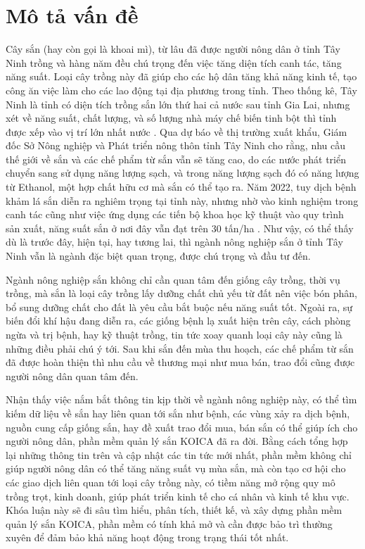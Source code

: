 \documentclass[./../main.tex]{subfiles}
\begin{document}
\section{Mô tả vấn đề}

Cây sắn (hay còn gọi là khoai mì), từ lâu đã được người nông dân ở tỉnh Tây Ninh trồng và hàng năm đều chú trọng đến việc tăng diện tích canh tác, tăng năng suất. Loại cây trồng này đã giúp cho các hộ dân tăng khả năng kinh tế, tạo công ăn việc làm cho các lao động tại địa phương trong tỉnh. Theo thống kê, Tây Ninh là tỉnh có diện tích trồng sắn lớn thứ hai cả nước sau tỉnh Gia Lai, nhưng xét về năng suất, chất lượng, và số lượng nhà máy chế biến tinh bột thì tỉnh được xếp vào vị trí lớn nhất nước \cite{tayninh1}. Qua dự báo về thị trường xuất khẩu, Giám đốc Sở Nông nghiệp và Phát triển nông thôn tỉnh Tây Ninh cho rằng, nhu cầu thế giới về sắn và các chế phẩm từ sắn vẫn sẽ tăng cao, do các nước phát triển chuyển sang sử dụng năng lượng sạch, và trong năng lượng sạch đó có năng lượng từ Ethanol, một hợp chất hữu cơ mà sắn có thể tạo ra. Năm 2022, tuy dịch bệnh khảm lá sắn diễn ra nghiêm trọng tại tỉnh này, nhưng nhờ vào kinh nghiệm trong canh tác cũng như việc ứng dụng các tiến bộ khoa học kỹ thuật vào quy trình sản xuất, năng suất sắn ở nơi đây vẫn đạt trên 30 tấn/ha \cite{tayninh2}. Như vậy, có thể thấy dù là trước đây, hiện tại, hay tương lai, thì ngành nông nghiệp sắn ở tỉnh Tây Ninh vẫn là ngành đặc biệt quan trọng, được chú trọng và đầu tư đến.

Ngành nông nghiệp sắn không chỉ cần quan tâm đến giống cây trồng, thời vụ trồng, mà sắn là loại cây trồng lấy dưỡng chất chủ yếu từ đất nên việc bón phân, bổ sung dưỡng chất cho đất là yêu cầu bắt buộc nếu năng suất tốt. Ngoài ra, sự biến đổi khí hậu đang diễn ra, các giống bệnh lạ xuất hiện trên cây, cách phòng ngừa và trị bệnh, hay kỹ thuật trồng, tin tức xoay quanh loại cây này cũng là những điều phải chú ý tới. Sau khi sắn đến mùa thu hoạch, các chế phẩm từ sắn đã được hoàn thiện thì nhu cầu về thương mại như mua bán, trao đổi cũng được người nông dân quan tâm đến.

Nhận thấy việc nắm bắt thông tin kịp thời về ngành nông nghiệp này, có thể tìm kiếm dữ liệu về sắn hay liên quan tới sắn như bệnh, các vùng xảy ra dịch bệnh, nguồn cung cấp giống sắn, hay đề xuất trao đổi mua, bán sắn có thể giúp ích cho người nông dân, phần mềm quản lý sắn KOICA đã ra đời. Bằng cách tổng hợp lại những thông tin trên và cập nhật các tin tức mới nhất, phần mềm không chỉ giúp người nông dân có thể tăng năng suất vụ mùa sắn, mà còn tạo cơ hội cho các giao dịch liên quan tới loại cây trồng này, có tiềm năng mở rộng quy mô trồng trọt, kinh doanh, giúp phát triển kinh tế cho cá nhân và kinh tế khu vực. Khóa luận này sẽ đi sâu tìm hiểu, phân tích, thiết kế, và xây dựng phần mềm quản lý sắn KOICA, phần mềm có tính khả mở và cần được bảo trì thường xuyên để đảm bảo khả năng hoạt động trong trạng thái tốt nhất.
\end{document}
